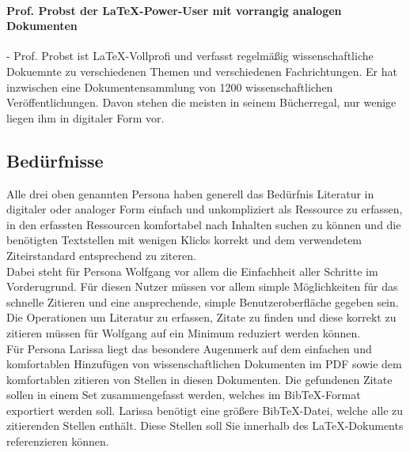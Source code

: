 \documentclass[a4paper,12pt]{article}
\begin{document}
\paragraph{Prof. Probst der LaTeX-Power-User mit vorrangig analogen Dokumenten}
- Prof. Probst ist LaTeX-Vollprofi und verfasst regelmäßig wissenschaftliche Dokuemnte zu verschiedenen Themen und verschiedenen Fachrichtungen. Er hat inzwischen eine Dokumentensammlung von 1200 wissenschaftlichen Veröffentlichungen. Davon stehen die meisten in seinem Bücherregal, nur wenige liegen ihm in digitaler Form vor.

\subsection{Bedürfnisse}

Alle drei oben genannten Persona haben generell das Bedürfnis Literatur in digitaler oder analoger Form einfach und unkompliziert als Ressource zu erfassen, in den erfassten Ressourcen komfortabel nach Inhalten suchen zu können und die benötigten Textstellen mit wenigen Klicks korrekt und dem verwendetem Ziteirstandard entsprechend zu ziteren.\\

Dabei steht für Persona Wolfgang vor allem die Einfachheit aller Schritte im Vorderugrund. Für diesen Nutzer müssen vor allem simple Möglichkeiten für das schnelle Zitieren und eine ansprechende, simple Benutzeroberfläche gegeben sein. Die Operationen um Literatur zu erfassen, Zitate zu finden und diese korrekt zu zitieren müssen für Wolfgang auf ein Minimum reduziert werden können.\\

Für Persona Larissa liegt das besondere Augenmerk auf dem einfachen und komfortablen Hinzufügen von wissenschaftlichen Dokumenten im PDF sowie dem komfortablen zitieren von Stellen in diesen Dokumenten. Die gefundenen Zitate sollen in einem Set zusammengefasst werden, welches im BibTeX-Format exportiert werden soll. Larissa benötigt eine größere BibTeX-Datei, welche alle zu zitierenden Stellen enthält. Diese Stellen soll Sie innerhalb des LaTeX-Dokuments referenzieren können.\\
\end{document}
